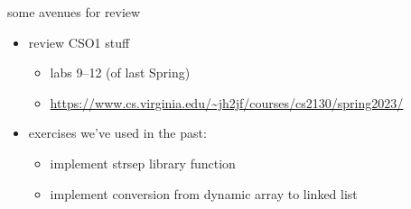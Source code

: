 
\begin{frame}{some avenues for review}
    \begin{itemize}
    \item review CSO1 stuff
        \begin{itemize}
        \item labs 9--12 (of last Spring)
        \item \url{https://www.cs.virginia.edu/~jh2jf/courses/cs2130/spring2023/}
        \end{itemize}
    \item exercises we've used in the past:
        \begin{itemize}
        \item implement strsep library function
        \item implement conversion from dynamic array to linked list
        \end{itemize}
    \end{itemize}
\end{frame}

\usetikzlibrary{shapes.misc}

